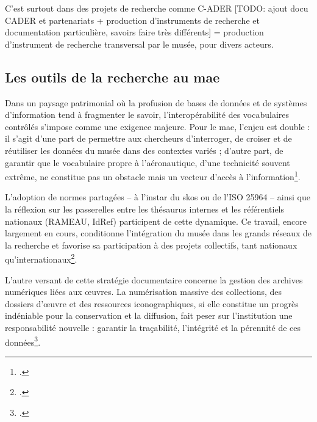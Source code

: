 C'est surtout dans des projets de recherche comme C-ADER [TODO: ajout docu CADER et partenariats + production d'instruments de recherche et documentation particulière, savoirs faire très différents] = production d'instrument de recherche transversal par le musée, pour divers acteurs.

\subsection{Les outils de la recherche au \ac{mae}}

Dans un paysage patrimonial où la profusion de bases de données et de systèmes d’information tend à fragmenter le savoir, l’interopérabilité des vocabulaires contrôlés s’impose comme une exigence majeure. Pour le \ac{mae}, l’enjeu est double : il s’agit d’une part de permettre aux chercheurs d’interroger, de croiser et de réutiliser les données du musée dans des contextes variés ; d’autre part, de garantir que le vocabulaire propre à l’aéronautique, d’une technicité souvent extrême, ne constitue pas un obstacle mais un vecteur d’accès à l’information\footcite{hudonISO25964Pour2012a,chichereauNormesConceptionGestion2007}. 

L’adoption de normes partagées – à l’instar du \ac{skos} ou de l’ISO 25964 – ainsi que la réflexion sur les passerelles entre les thésaurus internes et les référentiels nationaux (RAMEAU, IdRef) participent de cette dynamique. Ce travail, encore largement en cours, conditionne l’intégration du musée dans les grands réseaux de la recherche et favorise sa participation à des projets collectifs, tant nationaux qu’internationaux\footcite{nouvelThesaurusPACTOLSSysteme2019}.


L’autre versant de cette stratégie documentaire concerne la gestion des archives numériques liées aux œuvres. La numérisation massive des collections, des dossiers d’œuvre et des ressources iconographiques, si elle constitue un progrès indéniable pour la conservation et la diffusion, fait peser sur l’institution une responsabilité nouvelle : garantir la traçabilité, l’intégrité et la pérennité de ces données\footcite{ministeredelacultureDocumenterArchiverMusee2020,bechardArchivesElectroniques2020a}. 


